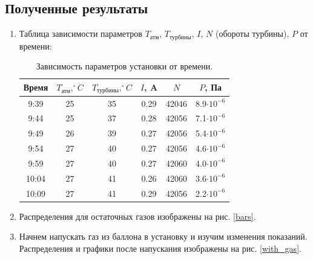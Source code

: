 \documentclass[a4paper, 12pt]{article}
\begin{document}
	\subsection{Полученные результаты}
	\begin{enumerate}
		\item Таблица зависимости параметров $T_\text{атм}$, $T_\text{турбины}$, $I$, $N$ (обороты турбины), $P$ от времени:
		\begin{table}[h]
			\centering
			\begin{tabular}{|c|c|c|c|c|c|}
				\hline
				Время & $T_\text{атм}, ^\circ C$ & $T_\text{турбины},^\circ C$ & $I$, A & $N$ & $P$, Па\\
				\hline
				9:39 & 25 & 35 & 0.29 & 42046 & 8.9$\cdot 10^{-6}$\\
				9:44 & 25 & 37 & 0.28 & 42056 & 7.1$\cdot 10^{-6}$\\
				9:49 & 26 & 39 & 0.27 & 42056 & 5.4$\cdot 10^{-6}$\\
				9:54 & 27 & 40 & 0.27 & 42056 & 4.6$\cdot 10^{-6}$\\
				9:59 & 27 & 40 & 0.27 & 42060 & 4.0$\cdot 10^{-6}$\\
				10:04 & 27 & 41 & 0.26 & 42060 & 3.6$\cdot 10^{-6}$\\
				10:09 & 27 & 41 & 0.29 & 42056 & 2.2$\cdot 10^{-6}$\\
				\hline
			\end{tabular}
			\caption{Зависимость параметров установки от времени.}
		\end{table}
		\item Распределения для остаточных газов изображены на рис. \ref{bars}.
		\item Начнем напускать газ из баллона в установку и изучим изменения показаний. Распределения и графики после напускания изображены на рис. \ref{with_gas}.
		\begin{figure}[h]
			\centering

\end{figure}
\end{enumerate}
\end{document}
